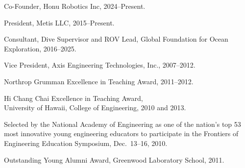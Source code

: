 \begin{cvitems}
  \item Co-Founder, Honu Robotics Inc, 2024--Present.
  \item President, Metis LLC, 2015--Present.
  \item Consultant, Dive Supervisor and ROV Lead, Global Foundation for Ocean Exploration, 2016--2025.
  \item Vice President, Axis Engineering Technologies, Inc., 2007--2012.
\end{cvitems}

\begin{cvitems}
  \item Northrop Grumman Excellence in Teaching Award, 2011--2012.
  \item Hi Chang Chai Excellence in Teaching Award, \\University of Hawaii, College of Engineering, 2010 and 2013.
  \item Selected by the National Academy of Engineering as one of the nation's top 53 most innovative young engineering educators to participate in the Frontiers of Engineering Education Symposium, Dec.\ 13--16, 2010.
  \item Outstanding Young Alumni Award, Greenwood Laboratory School, 2011.
\end{cvitems}

